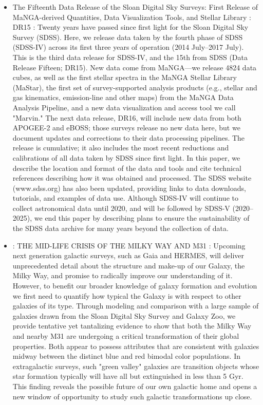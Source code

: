 \documentclass[ceqn,usenatbib,onecolumn]{mnras}
\begin{document}
\begin{itemize}
    \item \citet{2019ApJS..240...23A} The Fifteenth Data Release of the Sloan Digital Sky Surveys: First Release of MaNGA-derived Quantities, Data Visualization Tools, and Stellar Library : DR15 : Twenty years have passed since first light for the Sloan Digital Sky Survey (SDSS). Here, we release data taken by the fourth phase of SDSS (SDSS-IV) across its first three years of operation (2014 July–2017 July). This is the third data release for SDSS-IV, and the 15th from SDSS (Data Release Fifteen; DR15). New data come from MaNGA—we release 4824 data cubes, as well as the first stellar spectra in the MaNGA Stellar Library (MaStar), the first set of survey-supported analysis products (e.g., stellar and gas kinematics, emission-line and other maps) from the MaNGA Data Analysis Pipeline, and a new data visualization and access tool we call "Marvin." The next data release, DR16, will include new data from both APOGEE-2 and eBOSS; those surveys release no new data here, but we document updates and corrections to their data processing pipelines. The release is cumulative; it also includes the most recent reductions and calibrations of all data taken by SDSS since first light. In this paper, we describe the location and format of the data and tools and cite technical references describing how it was obtained and processed. The SDSS website (www.sdss.org) has also been updated, providing links to data downloads, tutorials, and examples of data use. Although SDSS-IV will continue to collect astronomical data until 2020, and will be followed by SDSS-V (2020–2025), we end this paper by describing plans to ensure the sustainability of the SDSS data archive for many years beyond the collection of data.
    \item \citet{Mutch_2011} : THE MID-LIFE CRISIS OF THE MILKY WAY AND M31 : Upcoming next generation galactic surveys, such as Gaia and HERMES, will deliver unprecedented detail about the structure and make-up of our Galaxy, the Milky Way, and promise to radically improve our understanding of it. However, to benefit our broader knowledge of galaxy formation and evolution we first need to quantify how typical the Galaxy is with respect to other galaxies of its type. Through modeling and comparison with a large sample of galaxies drawn from the Sloan Digital Sky Survey and Galaxy Zoo, we provide tentative yet tantalizing evidence to show that both the Milky Way and nearby M31 are undergoing a critical transformation of their global properties. Both appear to possess attributes that are consistent with galaxies midway between the distinct blue and red bimodal color populations. In extragalactic surveys, such "green valley" galaxies are transition objects whose star formation typically will have all but extinguished in less than 5 Gyr. This finding reveals the possible future of our own galactic home and opens a new window of opportunity to study such galactic transformations up close.
\end{itemize}
\end{document}
